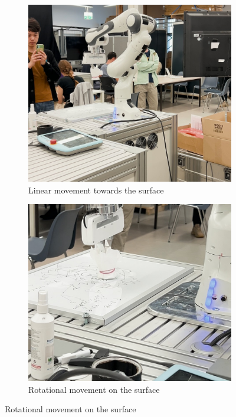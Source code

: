 \begin{figure}[htbp]
    \centering
    \begin{subfigure}{0.45\textwidth}
        \centering
        \includegraphics[width=\textwidth]{figures/start-pos-robot.png}
        \caption{Linear movement towards the surface}
        \label{fig:franka-down}
    \end{subfigure}
    \hfill
    \begin{subfigure}{0.45\textwidth}
        \centering
        \includegraphics[width=\textwidth]{figures/middle-pos-robot.png}
        \caption{Rotational movement on the surface}
        \label{fig:franka-mid}
    \end{subfigure}


\end{figure}
